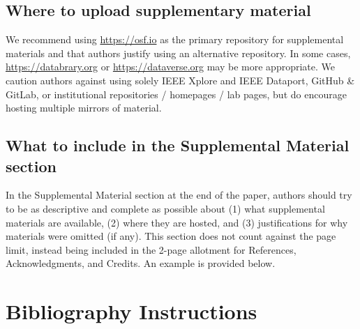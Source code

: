 \documentclass[widereview]{vgtc}             %
\begin{document}
\subsection{Where to upload supplementary material}
We recommend using \url{https://osf.io} as the primary repository for supplemental materials and that authors justify using an alternative repository.
In some cases, \url{https://databrary.org} or \url{https://dataverse.org} may be more appropriate.
We caution authors against using solely IEEE Xplore and IEEE Dataport, GitHub \& GitLab, or institutional repositories / homepages / lab pages, but do encourage hosting multiple mirrors of material.

\subsection{What to include in the Supplemental Material section}

In the Supplemental Material section at the end of the paper, authors should try to be as descriptive and complete as possible about (1) what supplemental materials are available, (2) where they are hosted, and (3) justifications for why materials were omitted (if any).
This section does not count against the page limit, instead being included in the 2-page allotment for References, Acknowledgments, and Credits.
An example is provided below.

\section{Bibliography Instructions}
\label{sec:bib_inst}
\end{document}
